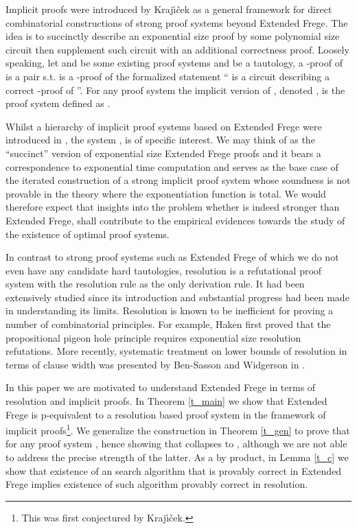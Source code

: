 \documentclass{LMCS}
\theoremstyle{plain}\newtheorem{satz}[thm]{Satz}
\begin{document}
Implicit proofs were introduced by Kraj{\'{\i}}{\v{c}}ek \cite{MR2058178} as a general framework for direct combinatorial constructions of strong proof systems beyond Extended Frege. The idea is to succinctly describe an exponential size proof by some polynomial size circuit then supplement such circuit with an additional correctness proof.
Loosely speaking, let  and  be some existing proof systems and  be a tautology, a -proof of  is a pair  s.t.  is a -proof of the formalized statement `` is a circuit describing a correct -proof of ''. For any proof system  the implicit version of , denoted , is the proof system defined as .

Whilst a hierarchy of implicit proof systems based on Extended Frege were introduced in \cite{MR2058178}, the system , is of specific interest. We may think of  as the ``succinct'' version of exponential size Extended Frege proofs and it bears a correspondence to exponential time computation and serves as the base case of the iterated construction of a strong implicit proof system whose soundness is not provable in the theory  where the exponentiation function is total. We would therefore expect that insights into the problem whether  is indeed stronger than Extended Frege, shall contribute to the empirical evidences towards the study of the existence of optimal proof systems.

In contrast to strong proof systems such as Extended Frege of which we do not even have any candidate hard tautologies, resolution is a refutational proof system with the resolution rule as the only derivation rule. It had been extensively studied since its introduction and substantial progress had been made in understanding its limits. Resolution is known to be inefficient for proving a number of combinatorial principles. For example, Haken \cite{MR821207} first proved that the propositional pigeon hole principle requires exponential size resolution refutations. More recently, systematic treatment on lower bounds of resolution in terms of clause width was presented by Ben-Sasson and Widgerson in \cite{MR1868713}.

In this paper we are motivated to understand Extended Frege in terms of resolution and implicit proofs. In Theorem \ref{t_main} we show that Extended Frege is p-equivalent to a resolution based proof system in the framework of implicit proofs\footnote{This was first conjectured by Kraj{\'{\i}}{\v{c}}ek.}. We generalize the construction in Theorem \ref{t_gen} to prove that  for any proof system , hence showing that  collapses to , although we are not able to address the precise strength of the latter. As a by product, in Lemma \ref{t_c} we show that existence of an  search algorithm that is provably correct in Extended Frege implies existence of such algorithm provably correct in resolution.
\end{document}

